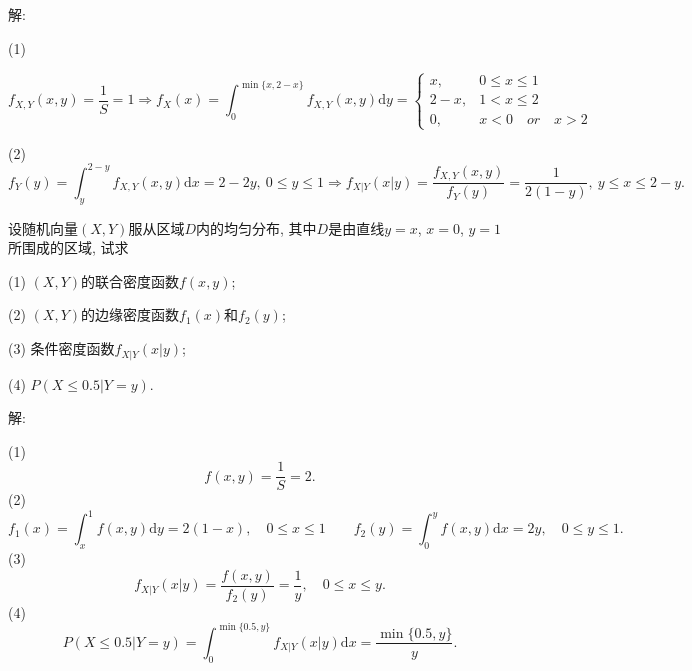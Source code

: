 \documentclass[standard]{ExBook}
\begin{document}
\begin{qitems}
\vspace{-5em}

    \begin{bbox}
解: 

(1)
\vspace{-2em}
\begin{center}
\begin{equation}
    f_{X,Y}(x,y)=\frac{1}{S}=1
    \Longrightarrow
    f_{X}(x)=\int_{0}^{\min\{x,2-x\}}f_{X,Y}(x,y)\mathrm{d}y=
    \left\{
    \begin{array}{cl}
        \nonumber
        x, & 0\leq x\leq 1\\
        2-x, & 1<x\leq2\\
        0, & x<0\quad or\quad x>2
    \end{array}
    \right.
\end{equation}
\end{center}
(2)
$$f_{Y}(y)=\int_{y}^{2-y}f_{X,Y}(x,y)\mathrm{d}x=2-2y,\ 0\leq y\leq 1 \Longrightarrow f_{X|Y}(x|y)=\frac{f_{X,Y}(x,y)}{f_{Y}(y)}=\frac{1}{2(1-y)},\ y\leq x\leq 2-y.$$
    \end{bbox}

\vspace{-5em}

    \begin{bbox}
    \begin{shaded}
        \qitem
设随机向量$(X,Y)$服从区域$D$内的均匀分布, 其中$D$是由直线$y=x$, $x=0$, $y=1$所围成的区域, 试求

(1) $(X,Y)$的联合密度函数$f(x,y)$;

(2) $(X,Y)$的边缘密度函数$f_{1}(x)$和$f_{2}(y)$;

(3) 条件密度函数$f_{X|Y}(x|y)$;

(4) $P(X\leq 0.5|Y=y)$.
    \end{shaded}
    \end{bbox}

\vspace{-5em}

    \begin{bbox}
解: 

(1)
$$f(x,y)=\frac{1}{S}=2.$$
(2)
$$f_{1}(x)=\int_{x}^{1}f(x,y)\mathrm{d}y=2(1-x),\quad 0\leq x\leq 1\qquad f_{2}(y)=\int_{0}^{y}f(x,y)\mathrm{d}x=2y,\quad 0\leq y\leq 1.$$
(3)
$$f_{X|Y}(x|y)=\frac{f(x,y)}{f_{2}(y)}=\frac{1}{y},\quad 0\leq x\leq y.$$
(4)
$$P(X\leq0.5|Y=y)=\int_{0}^{\min\{0.5,y\}}f_{X|Y}(x|y)\mathrm{d}x=\frac{\min\{0.5,y\}}{y}.$$
    \end{bbox}


\end{qitems}
\end{document}
